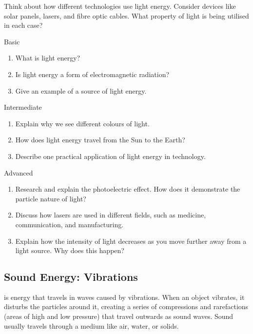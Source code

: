 \begin{stopandthink}
Think about how different technologies use light energy. Consider devices like solar panels, lasers, and fibre optic cables.  What property of light is being utilised in each case?
\end{stopandthink}


\begin{tieredquestions}{Basic}
\begin{enumerate}
    \item What is light energy?
    \item Is light energy a form of electromagnetic radiation?
    \item Give an example of a source of light energy.
\end{enumerate}
\end{tieredquestions}

\begin{tieredquestions}{Intermediate}
\begin{enumerate}
    \item Explain why we see different colours of light.
    \item How does light energy travel from the Sun to the Earth?
    \item Describe one practical application of light energy in technology.
\end{enumerate}
\end{tieredquestions}

\begin{tieredquestions}{Advanced}
\begin{enumerate}
    \item Research and explain the photoelectric effect. How does it demonstrate the particle nature of light?
    \item Discuss how lasers are used in different fields, such as medicine, communication, and manufacturing.
    \item Explain how the intensity of light decreases as you move further away from a light source.  Why does this happen?
\end{enumerate}
\end{tieredquestions}


\subsection{Sound Energy: Vibrations}

 is energy that travels in waves caused by vibrations.  When an object vibrates, it disturbs the particles around it, creating a series of compressions and rarefactions (areas of high and low pressure) that travel outwards as sound waves.  Sound usually travels through a medium like air, water, or solids.

